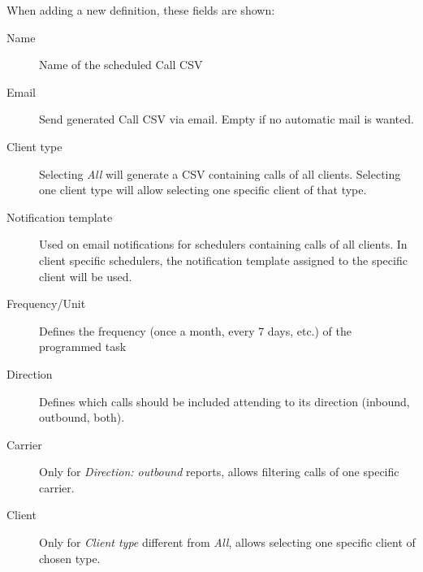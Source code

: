 \documentclass[letterpaper,10pt,english]{sphinxmanual}
\begin{document}
When adding a new definition, these fields are shown:
\begin{description}
\item[{Name}] \leavevmode{}\label{administration_portal/brand/calls/call_csv_schedulers:term-name}
Name of the scheduled Call CSV

\item[{Email}] \leavevmode{}\label{administration_portal/brand/calls/call_csv_schedulers:term-email}
Send generated Call CSV via email. Empty if no automatic mail is wanted.

\item[{Client type}] \leavevmode{}\label{administration_portal/brand/calls/call_csv_schedulers:term-client-type}
Selecting \emph{All} will generate a CSV containing calls of all clients. Selecting one client type
will allow selecting one specific client of that type.

\item[{Notification template}] \leavevmode{}\label{administration_portal/brand/calls/call_csv_schedulers:term-notification-template}
Used on email notifications for schedulers containing calls of all clients. In client specific
schedulers, the notification template assigned to the specific client will be used.

\item[{Frequency/Unit}] \leavevmode{}\label{administration_portal/brand/calls/call_csv_schedulers:term-frequency-unit}
Defines the frequency (once a month, every 7 days, etc.) of the programmed task

\item[{Direction}] \leavevmode{}\label{administration_portal/brand/calls/call_csv_schedulers:term-direction}
Defines which calls should be included attending to its direction (inbound, outbound, both).

\item[{Carrier}] \leavevmode{}\label{administration_portal/brand/calls/call_csv_schedulers:term-carrier}
Only for \emph{Direction: outbound} reports, allows filtering calls of one specific carrier.

\item[{Client}] \leavevmode{}\label{administration_portal/brand/calls/call_csv_schedulers:term-client}
Only for \emph{Client type} different from \emph{All}, allows selecting one specific client of chosen type.


\end{description}
\end{document}
